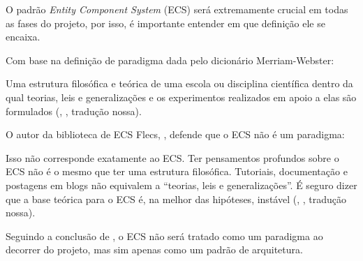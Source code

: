 O padrão \textit{Entity Component System} (ECS) será extremamente crucial em todas as fases do projeto, por isso, é importante entender em que definição ele se encaixa.

Com base na definição de paradigma dada pelo dicionário Merriam-Webster:

\begin{citacao}
	Uma estrutura filosófica e teórica de uma escola ou disciplina científica dentro da qual teorias, leis e generalizações e os experimentos realizados em apoio a elas são formulados (\citeauthor{merriamwebster}, \citeyear{merriamwebster}, tradução nossa).
\end{citacao}

O autor da biblioteca de ECS Flecs, \citeauthor{ecsparadigm}, defende que o ECS não é um paradigma:

\begin{citacao}
	Isso não corresponde exatamente ao ECS. Ter pensamentos profundos sobre o ECS não é o mesmo que ter uma estrutura filosófica. Tutoriais, documentação e postagens em blogs não equivalem a “teorias, leis e generalizações”. É seguro dizer que a base teórica para o ECS é, na melhor das hipóteses, instável (\citeauthor{ecsparadigm}, \citeyear{ecsparadigm}, tradução nossa).
\end{citacao}

Seguindo a conclusão de \citeauthor{ecsparadigm}, o ECS não será tratado como um paradigma ao decorrer do projeto, mas sim apenas como um padrão de arquitetura.
